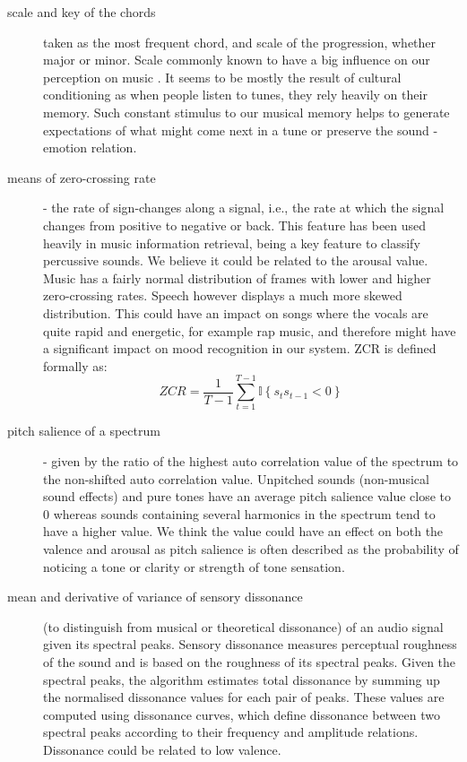 \begin{description}
\item[scale and key of the chords] taken as the most frequent chord, and scale of the progression, whether major or minor. Scale commonly known to have a big influence on our perception on music \cite{keys}. It seems to be mostly the result of cultural conditioning as when people listen to tunes, they rely heavily on their memory. Such constant stimulus to our musical memory helps to generate expectations of what might come next in a tune or preserve the sound - emotion relation.

\item[means of zero-crossing rate] - the rate of sign-changes along a signal, i.e., the rate at which the signal changes from positive to negative or back. This feature has been used heavily in music information retrieval, being a key feature to classify percussive sounds. We believe it could be related to the arousal value. Music has a fairly normal distribution of frames with lower and higher zero-crossing rates. Speech however displays a much more skewed distribution. This could have an impact on songs where the vocals are quite rapid and energetic, for example rap music, and therefore might have a significant impact on mood recognition in our system.
ZCR is defined formally as: 
\begin{equation}
ZCR = \frac{1}{T-1} \sum_{t=1}^{T-1} {{\mathbb I}\left\{{s_t s_{t-1} < 0}\right\}}
\end{equation}

\item[pitch salience of a spectrum] - given by the ratio of the highest auto correlation value of the spectrum to the non-shifted auto correlation value.  Unpitched sounds (non-musical sound effects) and pure tones have an average pitch salience value close to 0 whereas sounds containing several harmonics in the spectrum tend to have a higher value. We think the value could have an effect on both the valence and arousal as pitch salience is often described as the probability of noticing a tone or clarity or strength of tone sensation.

\item[mean and derivative of variance of sensory dissonance] (to distinguish from musical or theoretical dissonance) of an audio signal given its spectral peaks. Sensory dissonance measures perceptual roughness of the sound and is based on the roughness of its spectral peaks. Given the spectral peaks, the algorithm estimates total dissonance by summing up the normalised dissonance values for each pair of peaks. These values are computed using dissonance curves, which define dissonance between two spectral peaks according to their frequency and amplitude relations. Dissonance could be related to low valence.

\end{description}

